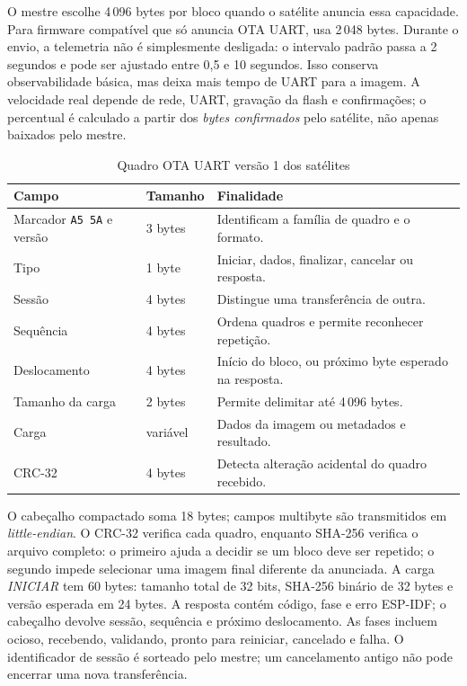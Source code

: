 O mestre escolhe 4\,096 bytes por bloco quando o satélite anuncia essa capacidade. Para firmware compatível que só anuncia OTA UART, usa 2\,048 bytes. Durante o envio, a telemetria não é simplesmente desligada: o intervalo padrão passa a 2 segundos e pode ser ajustado entre 0,5 e 10 segundos. Isso conserva observabilidade básica, mas deixa mais tempo de UART para a imagem. A velocidade real depende de rede, UART, gravação da flash e confirmações; o percentual é calculado a partir dos \emph{bytes confirmados} pelo satélite, não apenas baixados pelo mestre.

\begin{table}[htbp]\centering\small
\caption{Quadro OTA UART versão 1 dos satélites}\label{tab:quadro-ota-satelite}
\begin{tabularx}{\textwidth}{@{}l l X@{}}\toprule
Campo & Tamanho & Finalidade\\\midrule
Marcador \texttt{A5 5A} e versão & 3 bytes & Identificam a família de quadro e o formato.\\
Tipo & 1 byte & Iniciar, dados, finalizar, cancelar ou resposta.\\
Sessão & 4 bytes & Distingue uma transferência de outra.\\
Sequência & 4 bytes & Ordena quadros e permite reconhecer repetição.\\
Deslocamento & 4 bytes & Início do bloco, ou próximo byte esperado na resposta.\\
Tamanho da carga & 2 bytes & Permite delimitar até 4\,096 bytes.\\
Carga & variável & Dados da imagem ou metadados e resultado.\\
CRC-32 & 4 bytes & Detecta alteração acidental do quadro recebido.\\\bottomrule
\end{tabularx}\end{table}

O cabeçalho compactado soma 18 bytes; campos multibyte são transmitidos em \emph{little-endian}. O CRC-32 verifica cada quadro, enquanto SHA-256 verifica o arquivo completo: o primeiro ajuda a decidir se um bloco deve ser repetido; o segundo impede selecionar uma imagem final diferente da anunciada. A carga \emph{INICIAR} tem 60 bytes: tamanho total de 32 bits, SHA-256 binário de 32 bytes e versão esperada em 24 bytes. A resposta contém código, fase e erro ESP-IDF; o cabeçalho devolve sessão, sequência e próximo deslocamento. As fases incluem ocioso, recebendo, validando, pronto para reiniciar, cancelado e falha. O identificador de sessão é sorteado pelo mestre; um cancelamento antigo não pode encerrar uma nova transferência.

